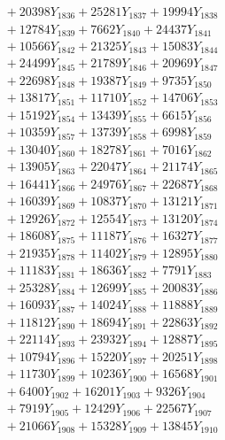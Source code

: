 \documentclass[a4paper,10pt]{article}
\begin{document}
{\begin{align}
&\;  + 20398 Y_{1836} + 25281 Y_{1837} + 19994 Y_{1838} \\[0.3ex]
&\;  + 12784 Y_{1839} + 7662 Y_{1840} + 24437 Y_{1841} \\[0.3ex]
&\;  + 10566 Y_{1842} + 21325 Y_{1843} + 15083 Y_{1844} \\[0.3ex]
&\;  + 24499 Y_{1845} + 21789 Y_{1846} + 20969 Y_{1847} \\[0.3ex]
&\;  + 22698 Y_{1848} + 19387 Y_{1849} + 9735 Y_{1850} \\[0.3ex]
&\;  + 13817 Y_{1851} + 11710 Y_{1852} + 14706 Y_{1853} \\[0.3ex]
&\;  + 15192 Y_{1854} + 13439 Y_{1855} + 6615 Y_{1856} \\[0.3ex]
&\;  + 10359 Y_{1857} + 13739 Y_{1858} + 6998 Y_{1859} \\[0.5ex]\allowbreak
&\;  + 13040 Y_{1860} + 18278 Y_{1861} + 7016 Y_{1862} \\[0.3ex]
&\;  + 13905 Y_{1863} + 22047 Y_{1864} + 21174 Y_{1865} \\[0.3ex]
&\;  + 16441 Y_{1866} + 24976 Y_{1867} + 22687 Y_{1868} \\[0.3ex]
&\;  + 16039 Y_{1869} + 10837 Y_{1870} + 13121 Y_{1871} \\[0.3ex]
&\;  + 12926 Y_{1872} + 12554 Y_{1873} + 13120 Y_{1874} \\[0.3ex]
&\;  + 18608 Y_{1875} + 11187 Y_{1876} + 16327 Y_{1877} \\[0.3ex]
&\;  + 21935 Y_{1878} + 11402 Y_{1879} + 12895 Y_{1880} \\[0.3ex]
&\;  + 11183 Y_{1881} + 18636 Y_{1882} + 7791 Y_{1883} \\[0.3ex]
&\;  + 25328 Y_{1884} + 12699 Y_{1885} + 20083 Y_{1886} \\[0.3ex]
&\;  + 16093 Y_{1887} + 14024 Y_{1888} + 11888 Y_{1889} \\[0.5ex]\allowbreak
&\;  + 11812 Y_{1890} + 18694 Y_{1891} + 22863 Y_{1892} \\[0.3ex]
&\;  + 22114 Y_{1893} + 23932 Y_{1894} + 12887 Y_{1895} \\[0.3ex]
&\;  + 10794 Y_{1896} + 15220 Y_{1897} + 20251 Y_{1898} \\[0.3ex]
&\;  + 11730 Y_{1899} + 10236 Y_{1900} + 16568 Y_{1901} \\[0.3ex]
&\;  + 6400 Y_{1902} + 16201 Y_{1903} + 9326 Y_{1904} \\[0.3ex]
&\;  + 7919 Y_{1905} + 12429 Y_{1906} + 22567 Y_{1907} \\[0.3ex]
&\;  + 21066 Y_{1908} + 15328 Y_{1909} + 13845 Y_{1910} \\[0.3ex]

\end{align}}
\end{document}
